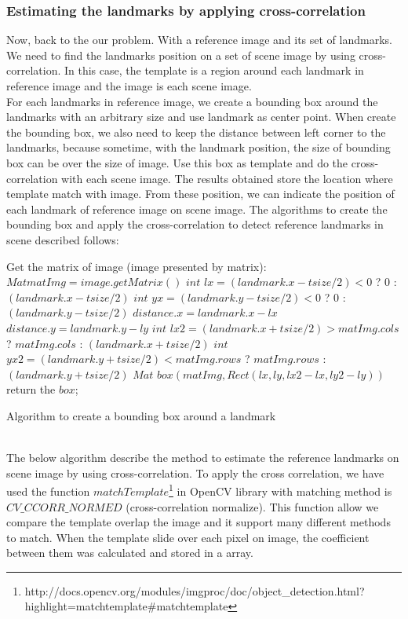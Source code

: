 \subsubsection{Estimating the landmarks by applying cross-correlation}
Now, back to the our problem. With a reference image and its set of landmarks. We need to find the landmarks position on a set of scene image by using cross-correlation. In this case, the template is a region around each landmark in reference image and the image is each scene image.\\[0.2cm]
For each landmarks in reference image, we create a bounding box around the landmarks with an arbitrary size and use landmark as center point. When create the bounding box, we also need to keep the distance between left corner to the landmarks, because sometime, with the landmark position, the size of bounding box can be over the size of image. Use this box as template and do the cross-correlation with each scene image. The results obtained store the location where template match with image. From these position, we can indicate the position of each landmark of reference image on scene image. The algorithms to create the bounding box and apply the cross-correlation to detect reference landmarks in scene described follows:\\[0.2cm]
\begin{algorithm}[H]
\Indm 
{}
\Indp
Get the matrix of image (image presented by matrix): $Mat matImg = image.getMatrix()$\;
$int$ $lx = (landmark.x - tsize/2) < 0$ ? $0$ : $(landmark.x - tsize/2)$\;
$int$ $yx = (landmark.y - tsize/2) < 0$ ? $0$ : $(landmark.y - tsize/2)$\;
$distance.x = landmark.x - lx$\;
$distance.y = landmark.y - ly$\;
$int$ $lx2 = (landmark.x + tsize/2) > matImg.cols$ ? $matImg.cols$ : $(landmark.x + tsize/2)$\;
$int$ $yx2 = (landmark.y + tsize/2) < matImg.rows$ ? $matImg.rows$ : $(landmark.y + tsize/2)$\;
$Mat$ $box(matImg,Rect(lx,ly,lx2 - lx, ly2 - ly))$\;
return the $box$;
\caption{Algorithm to create a bounding box around a landmark}
\end{algorithm}~\\[0.2cm]
The below algorithm describe the method to estimate the reference landmarks on scene image by using cross-correlation. To apply the cross correlation, we have used the function $matchTemplate$\footnote{http://docs.opencv.org/modules/imgproc/doc/object\_detection.html?highlight=matchtemplate\#matchtemplate} in OpenCV library with matching method is $CV\_CCORR\_NORMED$ (cross-correlation normalize). This function allow we compare the template overlap the image and it support many different methods to match. When the template slide over each pixel on image, the coefficient between them was calculated and stored in a array.\\[0.2cm]

